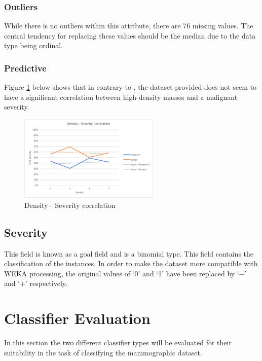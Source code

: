 \documentclass[12pt]{article}
\begin{document}
      \subsubsection{Outliers}
        While there is no outliers within this attribute, there are 76 missing values. The central tendency for replacing these values should be the median due to the data type being ordinal.

      \subsubsection{Predictive}
        Figure \ref{fig:density-severity-correlation} below shows that in contrary to \cite{woods2011mammographic}, the dataset provided does not seem to have a significant correlation between high-density masses and a malignant severity.

        \begin{figure}[H]
          \centering
          \includegraphics[width=0.6\textwidth]{density-severity-correlation}
          \caption{Density - Severity correlation}
          \label{fig:density-severity-correlation}
        \end{figure}

    \subsection{Severity}
      This field is known as a goal field and is a binomial type. This field contains the classification of the instances. In order to make the dataset more compatible with WEKA processing, the original values of ‘0’ and ‘1’ have been replaced by ‘$-$’ and ‘+’ respectively.

\section{Classifier Evaluation}
  In this section the two different classifier types will be evaluated for their suitability in the task of classifying the mammographic dataset.
\end{document}
